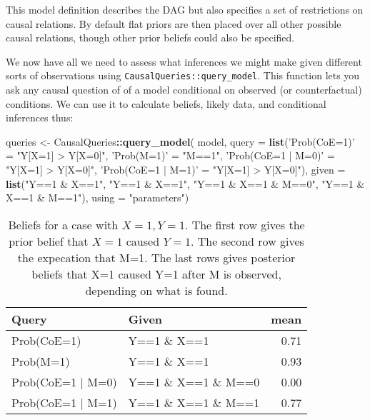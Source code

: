 \documentclass[
]{article}
\newenvironment{Shaded}{\begin{snugshade}}{\end{snugshade}}
\newcommand{\DataTypeTok}[1]{\textcolor[rgb]{0.13,0.29,0.53}{#1}}
\newcommand{\KeywordTok}[1]{\textcolor[rgb]{0.13,0.29,0.53}{\textbf{#1}}}
\newcommand{\NormalTok}[1]{#1}
\newcommand{\OperatorTok}[1]{\textcolor[rgb]{0.81,0.36,0.00}{\textbf{#1}}}
\newcommand{\StringTok}[1]{\textcolor[rgb]{0.31,0.60,0.02}{#1}}
\begin{document}
This model definition describes the DAG but also specifies a set of
restrictions on causal relations. By default flat priors are then placed
over all other possible causal relations, though other prior beliefs
could also be specified.

We now have all we need to assess what inferences we might make given
different sorts of observations using
\texttt{CausalQueries::query\_model}. This function lets you ask any
causal question of of a model conditional on observed (or
counterfactual) conditions. We can use it to calculate beliefs, likely
data, and conditional inferences thus:

\begin{Shaded}
\begin{Highlighting}[]
\NormalTok{queries <-}\StringTok{ }
\StringTok{  }\NormalTok{CausalQueries}\OperatorTok{::}\KeywordTok{query_model}\NormalTok{(}
\NormalTok{    model,}
    \DataTypeTok{query =} \KeywordTok{list}\NormalTok{(}\StringTok{'Prob(CoE=1)'}\NormalTok{ =}\StringTok{ "Y[X=1] > Y[X=0]"}\NormalTok{,}
                 \StringTok{'Prob(M=1)'}\NormalTok{ =}\StringTok{ "M==1"}\NormalTok{,}
                 \StringTok{'Prob(CoE=1 | M=0)'}\NormalTok{ =}\StringTok{ "Y[X=1] > Y[X=0]"}\NormalTok{,}
                 \StringTok{'Prob(CoE=1 | M=1)'}\NormalTok{ =}\StringTok{ "Y[X=1] > Y[X=0]"}\NormalTok{),}
    \DataTypeTok{given =} \KeywordTok{list}\NormalTok{(}\StringTok{"Y==1 & X==1"}\NormalTok{,}
                 \StringTok{"Y==1 & X==1"}\NormalTok{,}
                 \StringTok{"Y==1 & X==1 & M==0"}\NormalTok{,}
                 \StringTok{"Y==1 & X==1 & M==1"}\NormalTok{),}
    \DataTypeTok{using =} \StringTok{"parameters"}\NormalTok{) }
\end{Highlighting}
\end{Shaded}

\begin{table}

\caption{\label{tab:ptprobative}Beliefs for a case with $X=1, Y=1$. The first row gives the prior belief that $X=1$ caused $Y=1$.  The second row gives the expecation that M=1. The last rows gives posterior beliefs that X=1 caused Y=1 after M is observed, depending on what is found.}
\centering
\begin{tabular}[t]{l|l|r}
\hline
Query & Given & mean\\
\hline
Prob(CoE=1) & Y==1 \& X==1 & 0.71\\
\hline
Prob(M=1) & Y==1 \& X==1 & 0.93\\
\hline
Prob(CoE=1 | M=0) & Y==1 \& X==1 \& M==0 & 0.00\\
\hline
Prob(CoE=1 | M=1) & Y==1 \& X==1 \& M==1 & 0.77\\
\hline
\end{tabular}
\end{table}
\end{document}

